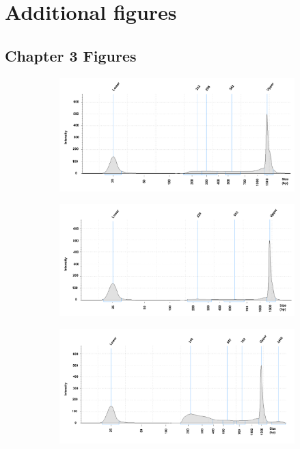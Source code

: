 \section{Additional figures}

\subsection{Chapter 3 Figures}
\begin{figure}[htbp]
\centering
\begin{subfigure}{0.70\textwidth}
\centering
\includegraphics[width=\textwidth]{./Appendix/pdfs/Chapter3/FAST_ATAC_skin_tapestation_C1}
\caption{\textbf{}}
\end{subfigure}
\begin{subfigure}{0.70\textwidth}
\centering
\includegraphics[width=\textwidth]{./Appendix/pdfs/Chapter3/FAST_ATAC_skin_tapestation_C3}
\caption{\textbf{}}
\end{subfigure}
\begin{subfigure}{0.70\textwidth}
\centering
\includegraphics[width=\textwidth]{./Appendix/pdfs/Chapter3/FAST_ATAC_skin_tapestation_C4}

\end{subfigure}
\end{figure}
